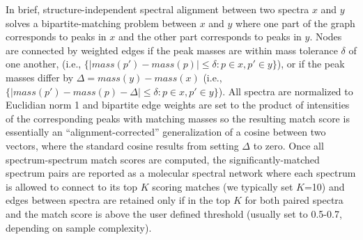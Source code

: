 \documentclass[arial,11pt]{article}
\begin{document}
In brief, structure-independent spectral alignment between two spectra $x$ and $y$ solves a bipartite-matching problem between $x$ and $y$ where one part of the graph corresponds to peaks in $x$ and the other part corresponds to peaks in $y$. Nodes are connected by weighted edges if the peak masses are within mass tolerance $\delta$ of one another, (i.e., $\{|mass(p')-mass(p)|\leq\delta : p\in x, p'\in y\}$), or if the peak masses differ by $\Delta=mass(y)-mass(x)$ (i.e., $\{|mass(p')-mass(p) - \Delta|\leq\delta : p\in x, p'\in y\}$). All spectra are normalized to Euclidian norm 1 and bipartite edge weights are set to the product of intensities of the corresponding peaks with matching masses so the resulting match score is essentially an ``alignment-corrected'' generalization of a cosine between two vectors, where the standard cosine results from setting $\Delta$ to zero.
%
Once all spectrum-spectrum match scores are computed, the significantly-matched spectrum pairs are reported as a molecular spectral network where each spectrum is allowed to connect to its top $K$ scoring matches (we typically set $K$=10) and edges between spectra are retained only if in the top $K$ for both paired spectra and the match score is above the user defined threshold (usually set to 0.5-0.7, depending on sample complexity).
\end{document}
